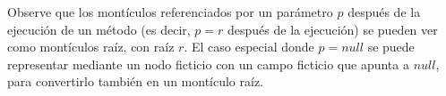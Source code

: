 Observe que los montículos referenciados por un parámetro $p$ después de la ejecución de un método (es decir, $p=r$ después de la ejecución) se pueden ver como montículos raíz, con raíz $r$. El caso especial donde $p=null$ se puede representar mediante un nodo ficticio con un campo ficticio que apunta a $null$, para convertirlo también en un montículo raíz.



